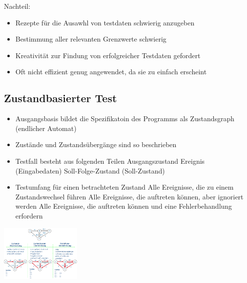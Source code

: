 \documentclass{report}
\newenvironment{Figure}
	{\par\medskip\noindent\minipage{\linewidth}}
	{\endminipage\par\medskip}
\theoremstyle{definition}
\theoremstyle{example}
\begin{document}
Nachteil:
\begin{itemize}
   \item Rezepte für die Ausawhl von testdaten schwierig anzugeben
   \item Bestimmung aller relevanten Grenzwerte schwierig
   \item Kreativität zur Findung von erfolgreicher Testdaten gefordert
   \item Oft nicht effizient genug angewendet, da sie zu einfach erscheint
\end{itemize}

\subsection{Zustandbasierter Test}
\begin{itemize}
   \item Ausgangsbasis bildet die Spezifikatoin des Programms als Zustandsgraph (endlicher Automat)
   \item Zustände und Zustandsübergänge sind so beschrieben
   \item Testfall besteht aus folgenden Teilen
   \subitem Ausgangszustand
   \subitem Ereignis (Eingabedaten)
   \subitem Soll-Folge-Zustand (Soll-Zustand) 
   \item Testumfang für einen betrachteten Zustand
   \subitem Alle Ereignisse, die zu einem Zustandswechsel führen
   \subitem Alle Ereignisse, die auftreten können, aber ignoriert werden
   \subitem Alle Ereignisse, die auftreten können und eine Fehlerbehandlung erfordern
\end{itemize}

\begin{Figure}
   \centering
    \includegraphics[width=150px]{img/Zustandsgraph.png}
        \label{fig:Abbildung eines Zustandsgraphen}
    \end{Figure}
\end{document}
